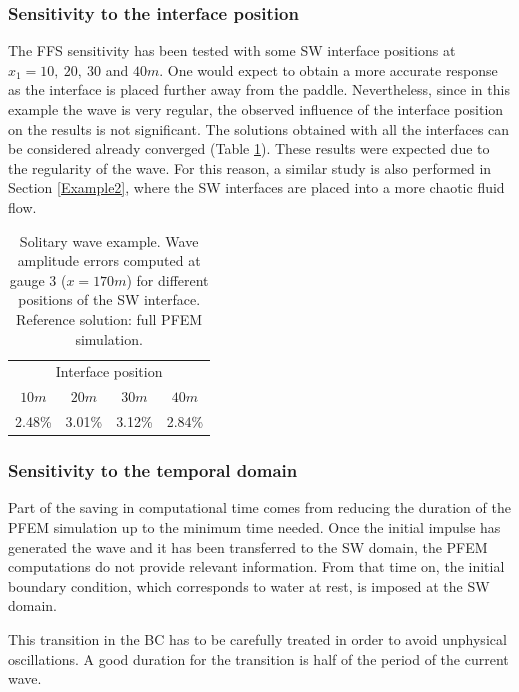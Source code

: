 \subsubsection{Sensitivity to the interface position}
The FFS sensitivity has been tested with some SW interface positions at $x_1=10,\ 20,\ 30$ and $40m$.
One would expect to obtain a more accurate response as the interface is placed further away from the paddle.
Nevertheless, since in this example the wave is very regular, the observed influence of the interface position on the results is not significant.
The solutions obtained with all the interfaces can be considered already converged (Table \ref{solitary_wave_BC_errors_interface}). These results were expected due to the regularity of the wave. For this reason, a similar study is also performed in Section \ref{Example2}, where the SW interfaces are placed into a more chaotic fluid flow.


\begin{table} [htb]
    \centering
    \begin{tabular}{cccc}
        \hline
\multicolumn{4}{c}{Interface position}  \\ \cline{1-4}
$10m$    & $20m$    & $30m$   & $40m$   \\ \hline
2.48\%   & 3.01\%   & 3.12\%  & 2.84\%  \\ \hline
    \end{tabular}
    \caption{Solitary wave example. Wave amplitude errors computed at gauge 3 ($x=170m$) for different positions of the SW interface. Reference solution: full PFEM simulation.}
    \label{solitary_wave_BC_errors_interface}
\end{table}


\subsubsection{Sensitivity to the temporal domain}
Part of the saving in computational time comes from reducing the duration of the PFEM simulation up to the minimum time needed. 
Once the initial impulse has generated the wave and it has been transferred to the SW domain, the PFEM computations do not provide relevant information. From that time on, the initial boundary condition, which corresponds to water at rest, is imposed at the SW domain.  

This transition in the BC has to be carefully treated in order to avoid unphysical oscillations. A good duration for the transition is half of the period of the current wave.

